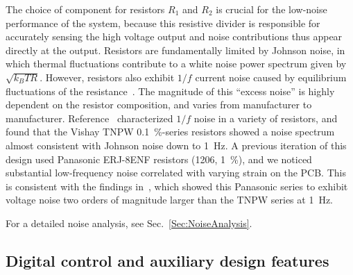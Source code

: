 \documentclass[aip,rsi,reprint]{revtex4-1} %
\begin{document}


The choice of component for resistors $R_1$ and $R_2$ is crucial for the low-noise performance of the system, because this resistive divider is responsible for accurately sensing the high voltage output and noise contributions thus appear directly at the output.
Resistors are fundamentally limited by Johnson noise, in which thermal fluctuations contribute to a white noise power spectrum given by $\sqrt{k_B T R}$.
However, resistors also exhibit $1/f$ current noise caused by equilibrium fluctuations of the resistance~\cite{Clarke1974a,Voss1976a}.
The magnitude of this ``excess noise'' is highly dependent on the resistor composition, and varies from manufacturer to manufacturer.
Reference~\cite{Seifert2009a} characterized $1/f$ noise in a variety of resistors, and found that the Vishay TNPW \SI{0.1}{\percent}-series resistors showed a noise spectrum almost consistent with Johnson noise down to \SI{1}{\hertz}.
A previous iteration of this design used Panasonic ERJ-8ENF resistors (1206, \SI{1}{\percent}), and we noticed substantial low-frequency noise correlated with varying strain on the PCB.
This is consistent with the findings in~\cite{Seifert2009a}, which showed this Panasonic series to exhibit voltage noise two orders of magnitude larger than the TNPW series at \SI{1}{\hertz}.

For a detailed noise analysis, see Sec.~\ref{Sec:NoiseAnalysis}.

\subsection{Digital control and auxiliary design features}
\label{Sec:DigControlAuxDesign}
\end{document}

